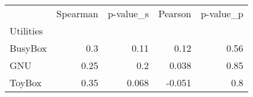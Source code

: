 \begin{tabular}{lrrrr}
\toprule
 & Spearman & p-value_s & Pearson & p-value_p \\
Utilities &  &  &  &  \\
\midrule
BusyBox & 0.3 & 0.11 & 0.12 & 0.56 \\
GNU & 0.25 & 0.2 & 0.038 & 0.85 \\
ToyBox & 0.35 & 0.068 & -0.051 & 0.8 \\
\bottomrule
\end{tabular}

